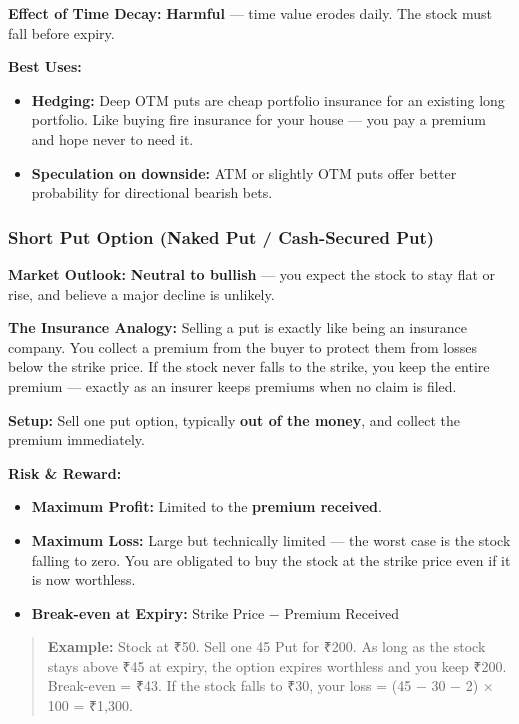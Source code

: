 \documentclass[12pt,openany]{book}
\begin{document}
\textbf{Effect of Time Decay:} \textbf{Harmful} — time value erodes daily. The stock must fall before expiry.

\textbf{Best Uses:}
\begin{itemize}[leftmargin=*]
    \item \textbf{Hedging:} Deep OTM puts are cheap portfolio insurance for an existing long portfolio. Like buying fire insurance for your house — you pay a premium and hope never to need it.
    \item \textbf{Speculation on downside:} ATM or slightly OTM puts offer better probability for directional bearish bets.
\end{itemize}

\subsubsection{Short Put Option (Naked Put / Cash-Secured Put)}

\textbf{Market Outlook:} \textbf{Neutral to bullish} — you expect the stock to stay flat or rise, and believe a major decline is unlikely.

\textbf{The Insurance Analogy:} Selling a put is exactly like being an insurance company. You collect a premium from the buyer to protect them from losses below the strike price. If the stock never falls to the strike, you keep the entire premium — exactly as an insurer keeps premiums when no claim is filed.

\textbf{Setup:} Sell one put option, typically \textbf{out of the money}, and collect the premium immediately.

\textbf{Risk \& Reward:}
\begin{itemize}[leftmargin=*]
    \item \textbf{Maximum Profit:} Limited to the \textbf{premium received}.
    \item \textbf{Maximum Loss:} Large but technically limited — the worst case is the stock falling to zero. You are obligated to buy the stock at the strike price even if it is now worthless.
    \item \textbf{Break-even at Expiry:} Strike Price − Premium Received
\end{itemize}

\begin{quote}
\textbf{Example:} Stock at ₹50. Sell one 45 Put for ₹200. As long as the stock stays above ₹45 at expiry, the option expires worthless and you keep ₹200. Break-even = ₹43. If the stock falls to ₹30, your loss = (45 − 30 − 2) × 100 = ₹1,300.
\end{quote}
\end{document}
